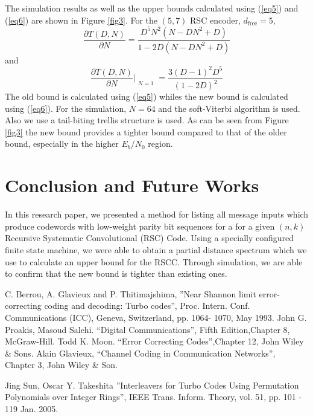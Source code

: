 \documentclass[conference]{IEEEtran}
\begin{document}
		The simulation results as well as the upper bounds calculated using (\ref{eq5}) and (\ref{eq6}) are shown in Figure \ref{fig3}. 
		For the $(5,7)$ RSC encoder, $d_{\text{free}}=5$, $$\frac{\partial T(D,N)}{\partial N} =\frac{D^5N^2(N-DN^2+D)}{1-2D(N-DN^2+D)}$$ and $$\frac{\partial T(D,N)}{\partial N}\Bigr|_{\substack{N=1}} = \frac{3(D-1)^2D^5}{(1-2D)^2}$$
		The old bound is calculated using  (\ref{eq5}) whiles the new bound is calculated using  (\ref{eq6}). For the simulation, $N=64$ and the soft-Viterbi algorithm is used. Also we use a tail-biting trellis structure is used. As can be seen from Figure \ref{fig3} the new bound provides a tighter bound compared to that of the older bound, especially in the higher $E_b/N_0$ region.
\section{Conclusion and Future Works}
\label{sec6}
In this research paper, we presented a method for listing all message inputs which produce codewords with low-weight parity bit sequences for a for a given $(n,k)$ Recursive Systematic Convolutional (RSC) Code. Using a specially configured finite state machine, we were able to obtain a partial distance spectrum which we use to calculate an upper bound for the RSCC. Through simulation, we are able to confirm that the new bound is tighter than existing ones. 




\begin{thebibliography}{99}
  C. Berrou, A. Glavieux and P. Thitimajshima, 
''Near Shannon limit error-correcting coding and
decoding: Turbo codes'', Proc. Intern. Conf. Communications (ICC), Geneva, 
Switzerland, pp. 1064-
1070, May 1993.
 John G. Proakis, Masoud Salehi. ``Digital Communications'', 
Fifth Edition,Chapter 8, McGraw-Hill.
 Todd K. Moon. ``Error Correcting Codes'',Chapter 12, John Wiley \& Sons.
Alain Glavieux, ``Channel Coding in Communication Networks'',\\ Chapter 3, John Wiley \& Son. 

 Jing Sun, Oscar Y. Takeshita ''Interleavers for Turbo Codes Using 
Permutation Polynomials over Integer Rings'', IEEE Trans. Inform. Theory, vol. 51, 
pp. 101 - 119  Jan. 2005.

\end{thebibliography}

%
\end{document}
